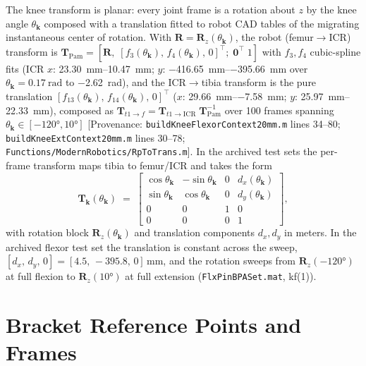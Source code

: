 The knee transform is planar: every joint frame is a rotation about $z$ by the knee angle $\theta_{\mathbf{k}}$ composed with a translation fitted to robot CAD tables of the migrating instantaneous center of rotation. With $\mathbf{R} = \mathbf{R}_{z}(\theta_{\mathbf{k}})$, the robot (femur$\to$ICR) transform is $\mathbf{T}_{\text{Pam}} = [\mathbf{R},\; [f_{3}(\theta_{\mathbf{k}}),\,f_{4}(\theta_{\mathbf{k}}),\,0]^{\top};\; \mathbf{0}^{\top}\;1]$ with $f_{3}, f_{4}$ cubic-spline fits (ICR $x$: \qtyrange{23.30}{10.47}{\mm}; $y$: \qtyrange{-416.65}{-395.66}{\mm} over $\theta_{\mathbf{k}} = \qty{0.17}{\radian}$ to \qty{-2.62}{\radian}), and the ICR$\to$tibia transform is the pure translation $[f_{13}(\theta_{\mathbf{k}}),\,f_{14}(\theta_{\mathbf{k}}),\,0]^{\top}$ ($x$: \qtyrange{29.66}{-7.58}{\mm}; $y$: \qtyrange{25.97}{22.33}{\mm}), composed as $\mathbf{T}_{t1\to f} = \mathbf{T}_{t1\to\text{ICR}}\;\mathbf{T}_{\text{Pam}}^{-1}$ over 100 frames spanning $\theta_{\mathbf{k}} \in [\ang{-120}, \ang{+10}]$ [Provenance: \nolinkurl{buildKneeFlexorContext20mm.m} lines 34--80; \nolinkurl{buildKneeExtContext20mm.m} lines 30--78; \nolinkurl{Functions/ModernRobotics/RpToTrans.m}]. In the archived test sets the per-frame transform maps tibia to femur/ICR and takes the form
\begin{equation}
    \mathbf{T}_{\mathbf{k}}(\theta_{\mathbf{k}}) \;=\;
    \begin{bmatrix}
    \cos\theta_{\mathbf{k}} & -\sin\theta_{\mathbf{k}} & 0 & d_{x}(\theta_{\mathbf{k}})\\
    \sin\theta_{\mathbf{k}} & \cos\theta_{\mathbf{k}} & 0 & d_{y}(\theta_{\mathbf{k}})\\
    0 & 0 & 1 & 0\\
    0 & 0 & 0 & 1
    \end{bmatrix},
    \label{eq:app_Tk}
\end{equation}
with rotation block $\mathbf{R}_{z}(\theta_{\mathbf{k}})$ and translation components $d_{x}, d_{y}$ in meters. In the archived flexor test set the translation is constant across the sweep, $[d_{x},\,d_{y},\,0] = [4.5,\,-395.8,\,0]\,\unit{\mm}$, and the rotation sweeps from $\mathbf{R}_{z}(\ang{-120})$ at full flexion to $\mathbf{R}_{z}(\ang{+10})$ at full extension (\nolinkurl{FlxPinBPASet.mat}, kf(1)).

\section{Bracket Reference Points and Frames}

